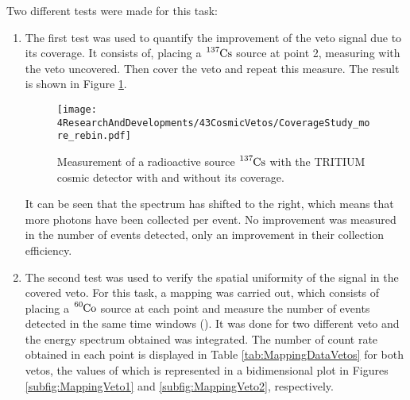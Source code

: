 Two different tests were made for this task:
\begin{enumerate}

\item{} The first test was used to quantify the improvement of the veto signal due to its coverage. It consists of, placing a $\ce{^{137}Cs}$ source at point 2, measuring with the veto uncovered. Then cover the veto and repeat this measure. The result is shown in Figure \ref{fig:VetoCoverageImprovement}.

\begin{figure}[h]
\centering
\texttt{[image: 4ResearchAndDevelopments/43CosmicVetos/CoverageStudy\_more\_rebin.pdf]}
\caption{Measurement of a radioactive source $\ce{^{137}Cs}$ with the TRITIUM cosmic detector with and without its coverage.\label{fig:VetoCoverageImprovement}}
\end{figure}

It can be seen that the spectrum has shifted to the right, which means that more photons have been collected per event. No improvement was measured in the number of events detected, only an improvement in their collection efficiency.


\item{} The second test was used to verify the spatial uniformity of the signal in the covered veto. For this task, a mapping was carried out, which consists of placing a $\ce{^{60}Co}$ source at each point and measure the number of events detected in the same time windows (). It was done for two different veto and the energy spectrum obtained was integrated. The number of count rate obtained in each point is displayed in Table \ref{tab:MappingDataVetos} for both vetos, the values of which is represented in a bidimensional plot in Figures \ref{subfig:MappingVeto1} and \ref{subfig:MappingVeto2}, respectively.


\end{enumerate}
